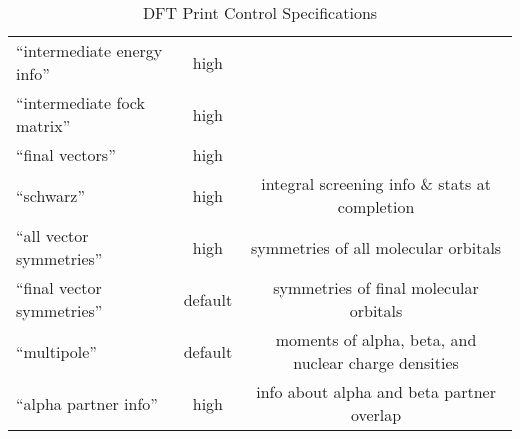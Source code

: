 \begin{table}[htbp]
\begin{center}
\begin{tabular}{lcc}
 ``intermediate energy info''       & high        & \\
 ``intermediate fock matrix''       & high        & \\
 ``final vectors''                  & high        & \\
 ``schwarz''                        & high        & integral screening info \& stats at completion\\
 ``all vector symmetries''          & high        & symmetries of all molecular orbitals \\
 ``final vector symmetries''        & default     & symmetries of final molecular orbitals \\
 ``multipole''                      & default     & moments of alpha, beta, and nuclear charge densities \\
 ``alpha partner info''             & high        & info about alpha and beta partner overlap \\
\end{tabular}
\end{center}
\caption{DFT Print Control Specifications}
\end{table}




